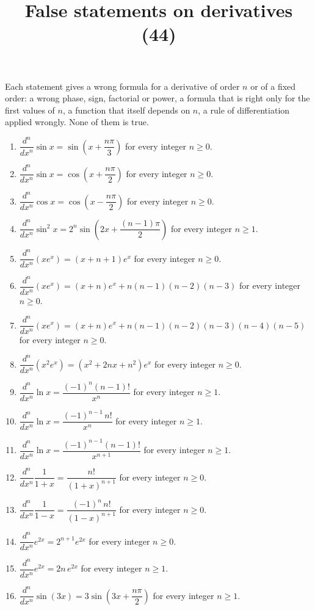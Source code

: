 \documentclass[11pt,a4paper]{article}
\title{False statements on derivatives (44)}
\author{}
\date{}
\begin{document}
\maketitle
Each statement gives a wrong formula for a derivative of order $n$ or of a fixed order: a wrong phase, sign, factorial or power, a formula that is right only for the first values of $n$, a function that itself depends on $n$, a rule of differentiation applied wrongly. None of them is true.

\begin{enumerate}
\item $\dfrac{d^n}{dx^n}\sin x=\sin\left(x+\dfrac{n\pi}{3}\right)$ for every integer $n\ge0$.
\item $\dfrac{d^n}{dx^n}\sin x=\cos\left(x+\dfrac{n\pi}{2}\right)$ for every integer $n\ge0$.
\item $\dfrac{d^n}{dx^n}\cos x=\cos\left(x-\dfrac{n\pi}{2}\right)$ for every integer $n\ge0$.
\item $\dfrac{d^n}{dx^n}\sin^2x=2^{n}\sin\left(2x+\dfrac{(n-1)\pi}{2}\right)$ for every integer $n\ge1$.
\item $\dfrac{d^n}{dx^n}\left(xe^{x}\right)=(x+n+1)e^{x}$ for every integer $n\ge0$.
\item $\dfrac{d^n}{dx^n}\left(xe^{x}\right)=(x+n)e^{x}+n(n-1)(n-2)(n-3)$ for every integer $n\ge0$.
\item $\dfrac{d^n}{dx^n}\left(xe^{x}\right)=(x+n)e^{x}+n(n-1)(n-2)(n-3)(n-4)(n-5)$ for every integer $n\ge0$.
\item $\dfrac{d^n}{dx^n}\left(x^2e^{x}\right)=\left(x^2+2nx+n^2\right)e^{x}$ for every integer $n\ge0$.
\item $\dfrac{d^n}{dx^n}\ln x=\dfrac{(-1)^{n}(n-1)!}{x^n}$ for every integer $n\ge1$.
\item $\dfrac{d^n}{dx^n}\ln x=\dfrac{(-1)^{n-1}\,n!}{x^n}$ for every integer $n\ge1$.
\item $\dfrac{d^n}{dx^n}\ln x=\dfrac{(-1)^{n-1}(n-1)!}{x^{n+1}}$ for every integer $n\ge1$.
\item $\dfrac{d^n}{dx^n}\dfrac{1}{1+x}=\dfrac{n!}{(1+x)^{n+1}}$ for every integer $n\ge0$.
\item $\dfrac{d^n}{dx^n}\dfrac{1}{1-x}=\dfrac{(-1)^{n}\,n!}{(1-x)^{n+1}}$ for every integer $n\ge0$.
\item $\dfrac{d^n}{dx^n}e^{2x}=2^{n+1}e^{2x}$ for every integer $n\ge0$.
\item $\dfrac{d^n}{dx^n}e^{2x}=2n\,e^{2x}$ for every integer $n\ge1$.
\item $\dfrac{d^n}{dx^n}\sin(3x)=3\sin\left(3x+\dfrac{n\pi}{2}\right)$ for every integer $n\ge1$.

\end{enumerate}
\end{document}
